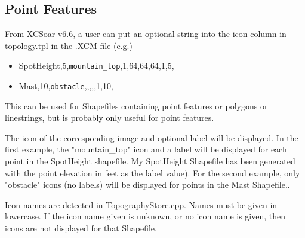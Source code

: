 \subsection{Point Features}
From XCSoar v6.6, a user can put an optional string into the icon column in topology.tpl in the .XCM file (e.g.)
\begin{itemize}
\item SpotHeight,5,\texttt{mountain\_top},1,64,64,64,1,5,
\item Mast,10,\texttt{obstacle},,,,,1,10,
\end{itemize}
This can be used for Shapefiles containing point features or polygons or linestrings, but is probably only useful for point features.

The icon of the corresponding image and optional label will be displayed. In the first example, 
the "mountain\_top" icon and a label will be displayed for each point in the SpotHeight shapefile. My
SpotHeight Shapefile has been generated with the point elevation in feet as the label value). For the second example, only "obstacle" icons 
(no labels) will be displayed for points in the Mast Shapefile..

Icon names are detected in TopographyStore.cpp. Names must be given in lowercase. If the icon name given is unknown, or no icon name is given, then icons are not displayed for that Shapefile.


